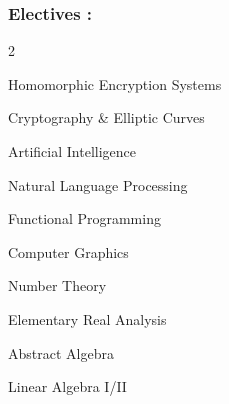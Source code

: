 \documentclass{article}
\newenvironment{mylist}[2]{
  \subsubsection*{#1}
  \begin{multicols}{#2}
  \small
  \begin{list}{}{}
   \setlength{\topsep}{0pt}
   \setlength{\itemsep}{1pt}
   \setlength{\parskip}{0pt}
   \setlength{\parsep}{0pt}}{\end{list}\end{multicols}\normalsize}
\begin{document}
\begin{comment}
\begin{mylist}{Courses :}{2}
\item Unix Software Development
\item Windows Software Development
\item Operating Systems
\item Computer Networks
\item Software Project Requirements Analysis
\item Software Project Design
\item Software Project Implementation
\item Analysis of Algorithms
\item Linear/Non-Linear Data Structures
\item Discrete Structures
\item Formal Languages/Automata
\item Programming Languages
\item Concurrent Programming
\item Computer Organization I/II
\item Probability and Statistical Inference
\item Object-Oriented Programming in C++
\end{mylist}
\end{comment}

\begin{mylist}{Electives :}{2}
\item Homomorphic Encryption Systems
\item Cryptography \& Elliptic Curves
\item Artificial Intelligence
\item Natural Language Processing
\item Functional Programming
\item Computer Graphics
\item Number Theory
\item Elementary Real Analysis
\item Abstract Algebra
\item Linear Algebra I/II
\end{mylist}
\end{document}
